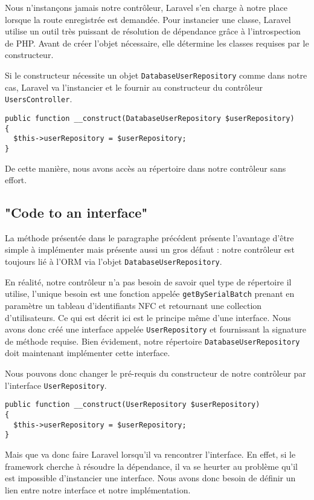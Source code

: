 Nous n'instançons jamais notre contrôleur, Laravel s'en charge à notre place lorsque la route enregistrée est demandée. Pour instancier une classe, Laravel utilise un outil très puissant de résolution de dépendance grâce à l'introspection de PHP. Avant de créer l'objet nécessaire, elle détermine les classes requises par le constructeur.

Si le constructeur nécessite un objet \verb|DatabaseUserRepository| comme dans notre cas, Laravel va l'instancier et le fournir au constructeur du contrôleur \verb|UsersController|.
\begin{verbatim}
public function __construct(DatabaseUserRepository $userRepository)
{
  $this->userRepository = $userRepository;
}
\end{verbatim}

De cette manière, nous avons accès au répertoire dans notre contrôleur sans effort.

\subsection{"Code to an interface"}

La méthode présentée dans le paragraphe précédent présente l'avantage d'être simple à implémenter mais présente aussi un gros défaut : notre contrôleur est toujours lié à l'ORM via l'objet \verb|DatabaseUserRepository|.

En réalité, notre contrôleur n'a pas besoin de savoir quel type de répertoire il utilise, l'unique besoin est une fonction appelée \verb|getBySerialBatch| prenant en paramètre un tableau d'identifiants NFC et retournant une collection d'utilisateurs. Ce qui est décrit ici est le principe même d'une interface. Nous avons donc créé une interface appelée \verb|UserRepository| et fournissant la signature de méthode requise. Bien évidement, notre répertoire \verb|DatabaseUserRepository| doit maintenant implémenter cette interface.

Nous pouvons donc changer le pré-requis du constructeur de notre contrôleur par l'interface \verb|UserRepository|.
\begin{verbatim}
public function __construct(UserRepository $userRepository)
{
  $this->userRepository = $userRepository;
}
\end{verbatim}

Mais que va donc faire Laravel lorsqu'il va rencontrer l'interface. En effet, si le framework cherche à résoudre la dépendance, il va se heurter au problème qu'il est impossible d'instancier une interface. Nous avons donc besoin de définir un lien entre notre interface et notre implémentation.

